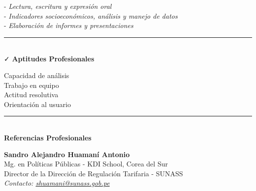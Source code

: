 \documentclass{resume}
\begin{document}
 - {\it Lectura, escritura y expresión oral} \\
 - {\it Indicadores socioeconómicos, análisis y manejo de datos} \\
 - {\it Elaboración de informes y presentaciones}
\vspace{5pt}



\vspace{5pt}
\noindent
\begin{minipage}{0.5\linewidth}
	{\color{vino} \noindent \rule{\textwidth}{1pt}} \\
	{\color{vino} \noindent \faCheck \; {\large \bf Aptitudes Profesionales}}
	\vspace{5pt}

	\noindent Capacidad de análisis \\
	Trabajo en equipo \\
	Actitud resolutiva \\
	Orientación al usuario
	\vspace{2pt}
\end{minipage}
\noindent
\begin{minipage}{0.5\linewidth}
	{\color{vino} \noindent \rule{\textwidth}{1pt}} \\
	{\color{vino} \noindent \faCommenting \; {\large \bf Referencias Profesionales}}
	\vspace{5pt}

	{\bf Sandro Alejandro Huamaní Antonio} \\
	{Mg. en Políticas Públicas - KDI School, Corea del Sur} \\
	{Director de la Dirección de Regulación Tarifaria - SUNASS} \\
	{\it Contacto: \href{mailto:shuamani@sunass.gob.pe}{shuamani@sunass.gob.pe}}
\end{minipage}
\end{document}
